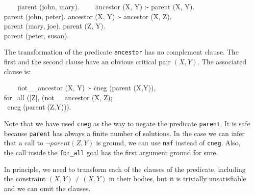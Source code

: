 \documentclass[]{llncs}
\newenvironment{mytabbing}
   {\vspace{0.3em}\begin{small}\begin{tabbing}}
   {\end{tabbing}\end{small}\vspace{0.3em}}
\begin{document}
\begin{tt}
\begin{mytabbing}
~~~~\=parent (john, mary). ~~~~\= ancestor (X, Y) :- parent (X, Y).\\
    \>parent (john, peter). \> ancestor (X, Y) :- \= ancestor (X, Z),\\ 
    \>parent (mary, joe).   \>                    \> parent (Z, Y). \\
    \>parent (peter, susan). 
\end{mytabbing}
\end{tt}
\noindent
The transformation of the predicate {\tt ancestor} has no complement
clause. The first and the second clause have an obvious critical
pair $(X, Y)$. The associated clause is:

\begin{tt}
\begin{mytabbing}
~~~~\=not\_\_ancestor (X, Y) :- \= cneg (parent (X,Y)), \\
    \>                          \> for\_all ([Z],
                       \=(not\_\_ancestor (X, Z); \\
    \>                          \>  \>~cneg (parent (Z,Y))).
\end{mytabbing}
\end{tt}

Note that we have used {\tt cneg} as the way to negate the
predicate {\tt parent}. It is safe because {\tt parent}
has always a finite number of solutions. In the case we can
infer that a call to $\neg parent (Z, Y)$ is ground, we can use
{\tt naf} instead of {\tt cneg}. Also, the call inside
the {\tt for\_all} goal has the first argument ground for sure.

In principle, we need to transform each of the clauses of the
predicate, including
the constraint $(X, Y) \neq (X, Y)$ in their bodies, but it
is trivially unsatisfiable and we can omit the clauses.




\end{document}

